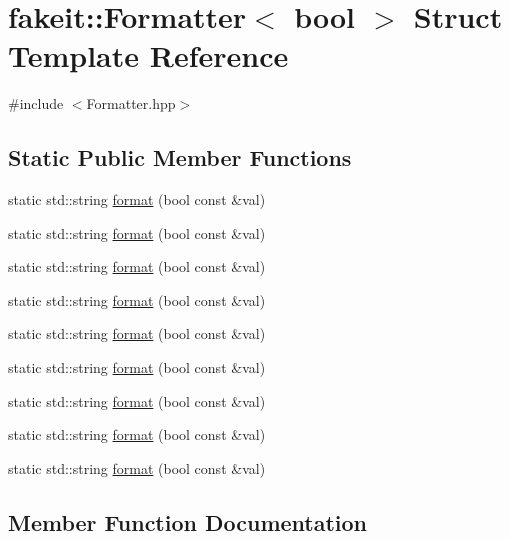 \hypertarget{structfakeit_1_1Formatter_3_01bool_01_4}{}\section{fakeit\+::Formatter$<$ bool $>$ Struct Template Reference}
\label{structfakeit_1_1Formatter_3_01bool_01_4}


{\ttfamily \#include $<$Formatter.\+hpp$>$}

\subsection*{Static Public Member Functions}
\begin{DoxyCompactItemize}
\item 
static std\+::string \mbox{\hyperlink{structfakeit_1_1Formatter_3_01bool_01_4_ade95cb15541529f9760a2916edf0887a}{format}} (bool const \&val)
\item 
static std\+::string \mbox{\hyperlink{structfakeit_1_1Formatter_3_01bool_01_4_ade95cb15541529f9760a2916edf0887a}{format}} (bool const \&val)
\item 
static std\+::string \mbox{\hyperlink{structfakeit_1_1Formatter_3_01bool_01_4_ade95cb15541529f9760a2916edf0887a}{format}} (bool const \&val)
\item 
static std\+::string \mbox{\hyperlink{structfakeit_1_1Formatter_3_01bool_01_4_ade95cb15541529f9760a2916edf0887a}{format}} (bool const \&val)
\item 
static std\+::string \mbox{\hyperlink{structfakeit_1_1Formatter_3_01bool_01_4_ade95cb15541529f9760a2916edf0887a}{format}} (bool const \&val)
\item 
static std\+::string \mbox{\hyperlink{structfakeit_1_1Formatter_3_01bool_01_4_ade95cb15541529f9760a2916edf0887a}{format}} (bool const \&val)
\item 
static std\+::string \mbox{\hyperlink{structfakeit_1_1Formatter_3_01bool_01_4_ade95cb15541529f9760a2916edf0887a}{format}} (bool const \&val)
\item 
static std\+::string \mbox{\hyperlink{structfakeit_1_1Formatter_3_01bool_01_4_ade95cb15541529f9760a2916edf0887a}{format}} (bool const \&val)
\item 
static std\+::string \mbox{\hyperlink{structfakeit_1_1Formatter_3_01bool_01_4_ade95cb15541529f9760a2916edf0887a}{format}} (bool const \&val)
\end{DoxyCompactItemize}


\subsection{Member Function Documentation}
\mbox{\label{structfakeit_1_1Formatter_3_01bool_01_4_ade95cb15541529f9760a2916edf0887a}} 
